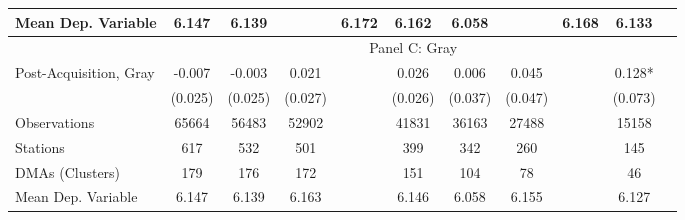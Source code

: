 {\begin{tabular}{l*{10}{c}}
Mean Dep. Variable&    6.147   &    6.139   &         &    6.172   &    6.162   &    6.058   &         &    6.168   &    6.133   \\
\midrule \ & \multicolumn{9}{c}{Panel C: Gray} \\\cmidrule(lr){2-10}
Post-Acquisition, Gray&   -0.007   &   -0.003   &    0.021   &         &    0.026   &    0.006   &    0.045   &         &    0.128*  \\
                &  (0.025)   &  (0.025)   &  (0.027)   &         &  (0.026)   &  (0.037)   &  (0.047)   &         &  (0.073)   \\
\midrule
Observations    &    65664   &    56483   &    52902   &         &    41831   &    36163   &    27488   &         &    15158   \\
Stations        &      617   &      532   &      501   &         &      399   &      342   &      260   &         &      145   \\
DMAs (Clusters) &      179   &      176   &      172   &         &      151   &      104   &       78   &         &       46   \\
Mean Dep. Variable&    6.147   &    6.139   &    6.163   &         &    6.146   &    6.058   &    6.155   &         &    6.127   \\
\bottomrule \end{tabular}}
